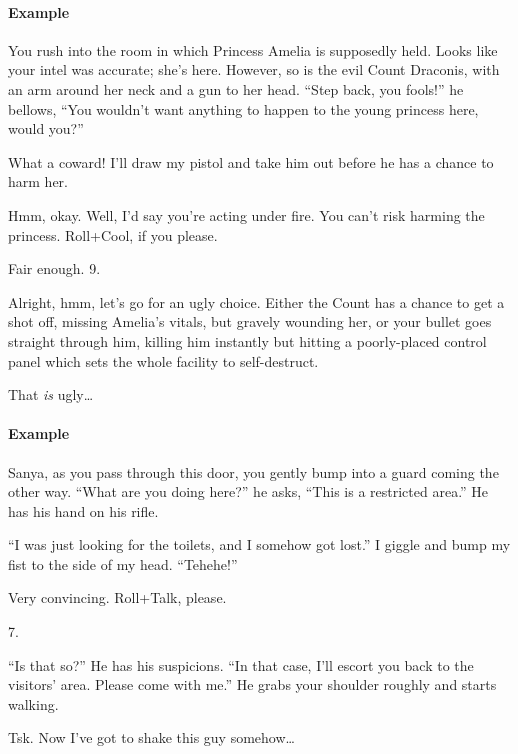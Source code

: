 \paragraph{Example}
\begin{dialogue}
   You rush into the room in which Princess Amelia is
  supposedly held. Looks like your intel was accurate; she's
  here. However, so is the evil Count Draconis, with an arm around her
  neck and a gun to her head. ``Step back, you fools!'' he bellows,
  ``You wouldn't want anything to happen to the young princess here,
  would you?''

   What a coward! I'll draw my pistol and take him
  out before he has a chance to harm her.

   Hmm, okay. Well, I'd say you're acting under fire. You
  can't risk harming the princess. Roll+Cool, if you please.

   Fair enough. 9.

   Alright, hmm, let's go for an ugly choice. Either the
  Count has a chance to get a shot off, missing Amelia's vitals, but
  gravely wounding her, or your bullet goes straight through him,
  killing him instantly but hitting a poorly-placed control panel
  which sets the whole facility to self-destruct.

   That \emph{is} ugly\ldots
\end{dialogue}


\paragraph{Example}
\begin{dialogue}
   Sanya, as you pass through this door, you gently bump
  into a guard coming the other way. ``What are you doing here?'' he
  asks, ``This is a restricted area.'' He has his hand on his rifle.

   ``I was just looking for the toilets, and I somehow
  got lost.'' I giggle and bump my fist to the side of my
  head. ``Tehehe!''

   Very convincing. Roll+Talk, please.

   7.

   ``Is that so?'' He has his suspicions. ``In that case,
  I'll escort you back to the visitors' area. Please come with me.''
  He grabs your shoulder roughly and starts walking.

   Tsk. Now I've got to shake this guy somehow\ldots
\end{dialogue}

